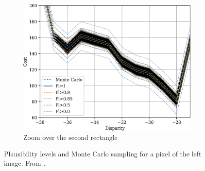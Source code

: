 \begin{figure}
\begin{subfigure}[t]{0.45\linewidth}
        \includegraphics[width=\linewidth]{Images/Chap_4/cost_curve_100_120_zoom2.png}
        \caption{Zoom over the second rectangle}
        \label{fig:montecarlo_gauss_100_120_zoom2}
    \end{subfigure}
    \caption{Plausibility levels and Monte Carlo sampling for a pixel of the left image. From \cite{malinowski_uncertainty_2024}.}
    \label{fig:montecarlo_gauss_100_120}
\end{figure}

